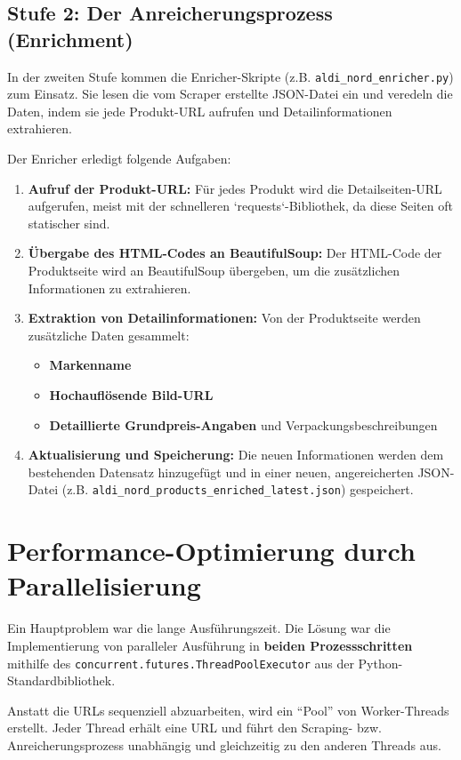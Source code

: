 \documentclass[12pt, a4paper]{report} %
\begin{document}
\subsection{Stufe 2: Der Anreicherungsprozess (Enrichment)}
In der zweiten Stufe kommen die Enricher-Skripte (z.B. \texttt{aldi\_nord\_enricher.py}) zum Einsatz. Sie lesen die vom Scraper erstellte JSON-Datei ein und veredeln die Daten, indem sie jede Produkt-URL aufrufen und Detailinformationen extrahieren.

Der Enricher erledigt folgende Aufgaben:
\begin{enumerate}
    \item \textbf{Aufruf der Produkt-URL:} Für jedes Produkt wird die Detailseiten-URL aufgerufen, meist mit der schnelleren `requests`-Bibliothek, da diese Seiten oft statischer sind.
    \item \textbf{Übergabe des HTML-Codes an BeautifulSoup:} Der HTML-Code der Produktseite wird an BeautifulSoup übergeben, um die zusätzlichen Informationen zu extrahieren.
    \item \textbf{Extraktion von Detailinformationen:} Von der Produktseite werden zusätzliche Daten gesammelt:
        \begin{itemize}
            \item \textbf{Markenname}
            \item \textbf{Hochauflösende Bild-URL}
            \item \textbf{Detaillierte Grundpreis-Angaben} und Verpackungsbeschreibungen
        \end{itemize}
    \item \textbf{Aktualisierung und Speicherung:} Die neuen Informationen werden dem bestehenden Datensatz hinzugefügt und in einer neuen, angereicherten JSON-Datei (z.B. \texttt{aldi\_nord\_products\_enriched\_latest.json}) gespeichert.
\end{enumerate}

\section{Performance-Optimierung durch Parallelisierung}
\label{sec:scraping_performance}
Ein Hauptproblem war die lange Ausführungszeit. Die Lösung war die Implementierung von paralleler Ausführung in \textbf{beiden Prozessschritten} mithilfe des \texttt{concurrent.futures.ThreadPoolExecutor} aus der Python-Standardbibliothek.

Anstatt die URLs sequenziell abzuarbeiten, wird ein "`Pool"' von Worker-Threads erstellt. Jeder Thread erhält eine URL und führt den Scraping- bzw. Anreicherungsprozess unabhängig und gleichzeitig zu den anderen Threads aus.
\end{document}

